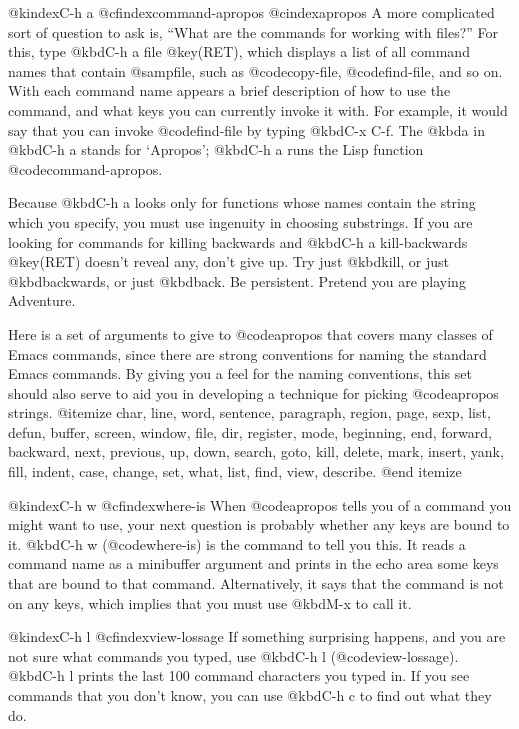 {{{{@kindex{C-h a}
@cfindex{command-apropos}
@cindex{apropos}
  A more complicated sort of question to ask is, ``What are the commands
for working with files?''  For this, type @kbd{C-h a file @key(RET)},
which displays a list of all command names that contain @samp{file}, such as
@code{copy-file}, @code{find-file}, and so on.  With each command name
appears a brief description of how to use the command, and what keys
you can currently invoke it with.  For example, it would say that
you can invoke @code{find-file} by typing @kbd{C-x C-f}.  The @kbd{a} in
@kbd{C-h a} stands for `Apropos'; @kbd{C-h a} runs the Lisp function
@code{command-apropos}.

  Because @kbd{C-h a} looks only for functions whose names contain the
string which you specify, you must use ingenuity in choosing substrings.
If you are looking for commands for killing backwards and @kbd{C-h a
kill-backwards @key(RET)} doesn't reveal any, don't give up.  Try just
@kbd{kill}, or just @kbd{backwards}, or just @kbd{back}.  Be persistent.
Pretend you are playing Adventure. 

  Here is a set of arguments to give to @code{apropos} that covers many
classes of Emacs commands, since there are strong conventions for naming
the standard Emacs commands.  By giving you a feel for the naming
conventions, this set should also serve to aid you in developing a
technique for picking @code{apropos} strings.
@itemize
char, line, word, sentence, paragraph, region, page, sexp, list, defun,
buffer, screen, window, file, dir, register, mode,
beginning, end, forward, backward, next, previous, up, down, search, goto,
kill, delete, mark, insert, yank, fill, indent, case,
change, set, what, list, find, view, describe.
@end itemize

@kindex{C-h w}
@cfindex{where-is}
  When @code{apropos} tells you of a command you might want to use, your next
question is probably whether any keys are bound to it.  @kbd{C-h w}
(@code{where-is}) is the command to tell you this.  It reads a command name
as a minibuffer argument and prints in the echo area some keys that are bound
to that command.  Alternatively, it says that the command is not on any keys,
which implies that you must use @kbd{M-x} to call it.

@kindex{C-h l}
@cfindex{view-lossage}
  If something surprising happens, and you are not sure what commands you
typed, use @kbd{C-h l} (@code{view-lossage}).  @kbd{C-h l} prints the last 100
command characters you typed in.  If you see commands that you don't know,
you can use @kbd{C-h c} to find out what they do.

}}}}
